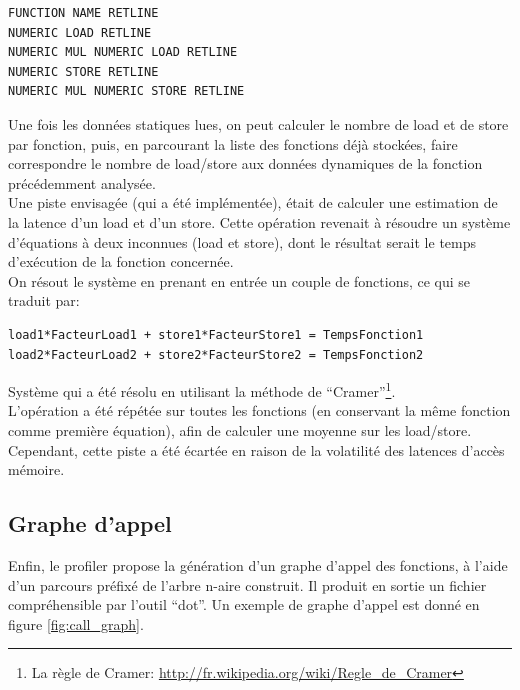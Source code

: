 \begin{verbatim}
FUNCTION NAME RETLINE
NUMERIC LOAD RETLINE
NUMERIC MUL NUMERIC LOAD RETLINE
NUMERIC STORE RETLINE
NUMERIC MUL NUMERIC STORE RETLINE
\end{verbatim}

Une fois les données statiques lues, on peut calculer le nombre de load et de store par fonction, puis, en parcourant la liste des fonctions déjà stockées, faire correspondre le nombre de load/store aux données dynamiques de la fonction précédemment analysée.\\

Une piste envisagée (qui a été implémentée), était de calculer une estimation de la latence d'un load et d'un store. Cette opération revenait à résoudre un système d'équations à deux inconnues (load et store), dont le résultat serait le temps d'exécution de la fonction concernée.\\

On résout le système en prenant en entrée un couple de fonctions, ce qui se traduit par:\\

\begin{verbatim}
load1*FacteurLoad1 + store1*FacteurStore1 = TempsFonction1
load2*FacteurLoad2 + store2*FacteurStore2 = TempsFonction2
\end{verbatim}

Système qui a été résolu en utilisant la méthode de ``Cramer''\footnote{La règle de Cramer: \url{http://fr.wikipedia.org/wiki/Regle_de_Cramer}}.\\

L'opération a été répétée sur toutes les fonctions (en conservant la même fonction comme première équation), afin de calculer une moyenne sur les load/store.
Cependant, cette piste a été écartée en raison de la volatilité des latences d'accès mémoire.

\subsection{Graphe d'appel}

Enfin, le profiler propose la génération d'un graphe d'appel des fonctions, à l'aide d'un parcours préfixé de l'arbre n-aire construit. Il produit en sortie un fichier compréhensible par l'outil ``dot''. Un exemple de graphe d'appel est donné en figure \ref{fig:call_graph}.

